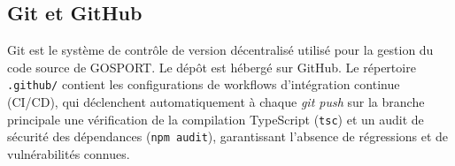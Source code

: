 \subsection{Git et GitHub}
Git est le système de contrôle de version décentralisé utilisé pour la gestion du code source de GOSPORT. Le dépôt est hébergé sur GitHub. Le répertoire \texttt{.github/} contient les configurations de workflows d'intégration continue (CI/CD), qui déclenchent automatiquement à chaque \textit{git push} sur la branche principale une vérification de la compilation TypeScript (\texttt{tsc}) et un audit de sécurité des dépendances (\texttt{npm audit}), garantissant l'absence de régressions et de vulnérabilités connues.
